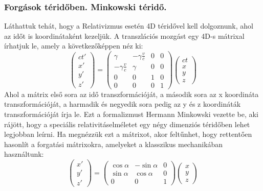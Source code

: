 \documentclass[a4paper,12pt]{article}
\begin{document}
\subsubsection*{Forgások téridőben. Minkowski téridő.}
Láthattuk tehát, hogy a Relativizmus esetén 4D téridővel kell dolgoznunk, ahol az időt is koordinátaként kezeljük.  
A transzlációs mozgást egy 4D-s mátrixal írhatjuk le, amely a következőképpen néz ki:
\begin{equation}
    \begin{pmatrix}
        ct' \\
        x' \\
        y' \\
        z'
    \end{pmatrix} =
    \begin{pmatrix}
        \gamma & -\gamma \frac{v}{c} & 0 & 0 \\
        -\gamma \frac{v}{c} & \gamma & 0 & 0 \\
        0 & 0 & 1 & 0 \\
        0 & 0 & 0 & 1
    \end{pmatrix}
    \begin{pmatrix}
        ct \\
        x \\
        y \\
        z
    \end{pmatrix}
\end{equation}
Ahol a mátrix első sora az idő transzformációját, a második sora az x koordináta transzformációját, a harmadik és negyedik sora pedig az y és z koordináták transzformációját írja le.
Ezt a formalizmust Hermann Minkowski vezette be, aki rájött, hogy a speciális relativitáselméletet egy négy dimenziós téridőben lehet legjobban leírni. Ha megnézzük ezt a mátrixot,
akor feltűnhet, hogy rettentően hasonlít a forgatási mátrixokra, amelyeket a klasszikus mechanikában használtunk:
\begin{equation}
    \begin{pmatrix}
        x' \\
        y' \\
        z'
    \end{pmatrix} =
    \begin{pmatrix}
        \cos \alpha & -\sin \alpha & 0 \\
        \sin \alpha & \cos \alpha & 0 \\
        0 & 0 & 1
    \end{pmatrix}
    \begin{pmatrix}
        x \\
        y \\
        z
    \end{pmatrix}
\end{equation}
\end{document}
